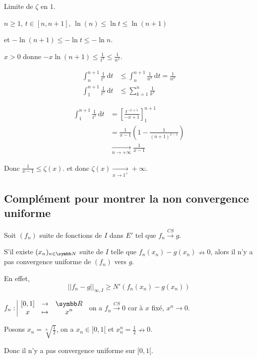 \begin{exemple}
    Limite de $\zeta$ en $1$.

    $n \geqslant 1, \, t \in [n, n+ 1], \, \ln(n) \leqslant \ln t \leqslant \ln (n+ 1)$
    
    et $-\ln(n + 1) \leqslant - \ln t \leqslant - \ln n$.

    $x > 0$ donne $- x \ln(n + 1) \leqslant \frac 1 {t^x} \leqslant \frac 1 {n^x}$.

    \begin{align}
        \int_n^{n + 1} \frac 1 {t^x} \,\mathrm{d}t & \leqslant \int_n^{n + 1} \frac 1 {n^x} \,\mathrm{d}t = \frac 1 {n^x} \\
        \int_1^{n + 1} \frac 1 {t^x} \, \mathrm{d}t & \leqslant \sum_{k = 1 }^{n } \frac 1 {k^x} 
    \end{align}

    \begin{align}
        \int_{1 }^{n + 1 } \frac 1 {t^x} \, \mathrm{d}t &  = \left[ \frac{t^{- x + 1}}{- x + 1} \right]_{1}^{n + 1} \\
        & = \frac{1 }{x - 1} \left( 1 - \frac 1 {(n + 1)^{x - 1}} \right)\\
        & \xrightarrow[n \to + \infty]{} \frac 1 {x - 1}
    \end{align} 

    Donc $\frac 1 {x - 1} \leqslant \zeta(x)$. et donc $\zeta(x) \xrightarrow[x \to 1^+]{} + \infty$.
\end{exemple}

\subsection{Complément pour montrer la non convergence uniforme}

\begin{proposition}{}{}
    Soit $(f_n)$ suite de fonctions de $I$ dans $E'$ tel que $f_n \xrightarrow{CS} g$. 

    S'il existe $(x_n)_{n \in \N}$ suite de $I$ telle que 
    $f_n(x_n) - g(x_n) \nrightarrow 0$, alors il n'y a pas convergence uniforme de $(f_n)$ vers $g$.

    En effet, $$||f_n - g||_{\infty, I} \geqslant N'(f_n(x_n) - g(x_n))$$
\end{proposition}

\begin{exemple}
    $\fonction{f_n}{[0, 1]}{\R} x {x^n}$ on a $f_n \xrightarrow{CS} 0$
    car à $x$ fixé, $x^n \to 0$.

    Posons $x_n = \sqrt[n]{\frac 1 2}$, on a $x_n \in [0, 1[$ et 
    $x_n^n = \frac 1 2 \nrightarrow 0$. 

    Donc il n'y a pas convergence uniforme sur $[0, 1[$. 
\end{exemple}


